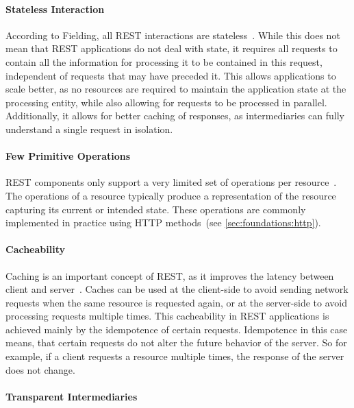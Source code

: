 \paragraph{Stateless Interaction}

According to Fielding, all \ac{REST} interactions are stateless~\cite{Fielding2000, Adamczyk2011}.
While this does not mean that \ac{REST} applications do not deal with state, it requires all requests to contain all the information for processing it to be contained in this request, independent of requests that may have preceded it.
This allows applications to scale better, as no resources are required to maintain the application state at the processing entity, while also allowing for requests to be processed in parallel.
Additionally, it allows for better caching of responses, as intermediaries can fully understand a single request in isolation.

\paragraph{Few Primitive Operations}

\ac{REST} components only support a very limited set of operations per resource~\cite{Erenkrantz2007}.
The operations of a resource typically produce a representation of the resource capturing its current or intended state.
These operations are commonly implemented in practice using \ac{HTTP} methods~(see \autoref{sec:foundations:http}).

\paragraph{Cacheability}

Caching is an important concept of \ac{REST}, as it improves the latency between client and server~\cite{Erenkrantz2007,Fielding2000}.
Caches can be used at the client-side to avoid sending network requests when the same resource is requested again, or at the server-side to avoid processing requests multiple times.
This cacheability in \ac{REST} applications is achieved mainly by the idempotence of certain requests.
Idempotence in this case means, that certain requests do not alter the future behavior of the server.
So for example, if a client requests a resource multiple times, the response of the server does not change.

\paragraph{Transparent Intermediaries}

